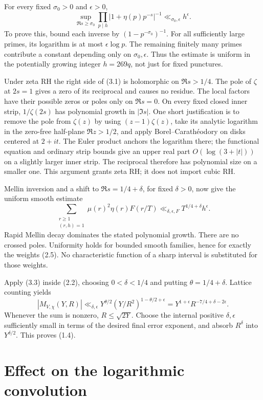 \documentclass[11pt]{article}
\begin{document}
For every fixed $\sigma_0>0$ and $\epsilon>0$,
\[
 \sup_{\Re s\ge\sigma_0}
 \prod_{p\mid h}|1+\eta(p)p^{-s}|^{-1}
                      \ll_{\sigma_0,\epsilon} h^\epsilon. \tag{3.2}
\]
To prove this, bound each inverse by $(1-p^{-\sigma_0})^{-1}$.
For all sufficiently large primes, its logarithm is at most
$\epsilon\log p$. The remaining finitely many primes contribute
a constant depending only on $\sigma_0,\epsilon$.
Thus the estimate is uniform in the potentially growing
integer $h=269q$, not just for fixed punctures.

Under zeta RH the right side of (3.1) is holomorphic on
$\Re s>1/4$. The pole of $\zeta$ at $2s=1$ gives a zero of its
reciprocal and causes no residue. The local factors have their
possible zeros or poles only on $\Re s=0$.
On every fixed closed inner strip, $1/\zeta(2s)$ has polynomial
growth in $|\Im s|$. One short justification is to remove the
pole from $\zeta(z)$ by using $(z-1)\zeta(z)$, take its analytic
logarithm in the zero-free half-plane $\Re z>1/2$, and apply
Borel--Carath\'eodory on disks centered at $2+it$.
The Euler product anchors the logarithm there; the functional
equation and ordinary strip bounds give an upper real part
$O(\log(3+|t|))$ on a slightly larger inner strip.
The reciprocal therefore has polynomial size on a smaller one.
This argument grants zeta RH; it does not import cubic RH.

Mellin inversion and a shift to $\Re s=1/4+\delta$, for fixed
$\delta>0$, now give the uniform smooth estimate
\[
 \sum_{\substack{r\ge1\\(r,h)=1}}\mu(r)^2\eta(r)F(r/T)
       \ll_{\delta,\epsilon,F}
                        T^{1/4+\delta}h^\epsilon.        \tag{3.3}
\]
Rapid Mellin decay dominates the stated polynomial growth.
There are no crossed poles. Uniformity holds for bounded
smooth families, hence for exactly the weights (2.5).
No characteristic function of a sharp interval is substituted
for those weights.

Apply (3.3) inside (2.2), choosing $0<\delta<1/4$ and
putting $\theta=1/4+\delta$.
Lattice counting yields
\[
 |M_{V,\chi}(Y,R)|
 \ll_{\delta,\epsilon}
     Y^{\theta/2}(Y/R^2)^{1-\theta/2+\epsilon}
 =Y^{1+\epsilon}R^{-7/4+\delta-2\epsilon}.                \tag{3.4}
\]
Whenever the sum is nonzero, $R\le\sqrt{2Y}$.
Choose the internal positive $\delta,\epsilon$ sufficiently
small in terms of the desired final error exponent, and
absorb $R^\delta$ into $Y^{\delta/2}$.
This proves (1.4).

\section{Effect on the logarithmic convolution}
\end{document}
